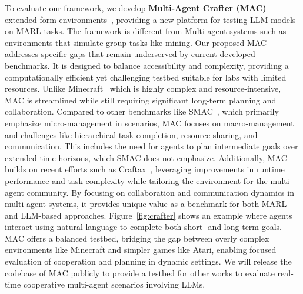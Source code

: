 

To evaluate our framework, we develop \textbf{Multi-Agent Crafter (MAC)} extended form environments~\cite{hafner2021benchmarking}, providing a new platform for testing LLM models on MARL tasks. 
The framework is different from Multi-agent systems such as environments that simulate group tasks like mining. Our proposed MAC addresses specific gaps that remain underserved by current developed benchmarks. It is designed to balance accessibility and complexity, providing a computationally efficient yet challenging testbed suitable for labs with limited resources. Unlike Minecraft~\cite{fan2022minedojo} which is highly complex and resource-intensive, MAC is streamlined while still requiring significant long-term planning and collaboration.
Compared to other benchmarks like SMAC~\cite{samvelyan2019starcraftmultiagentchallenge}, which primarily emphasize micro-management in scenarios, MAC focuses on macro-management and challenges like hierarchical task completion, resource sharing, and communication. This includes the need for agents to plan intermediate goals over extended time horizons, which SMAC does not emphasize.
Additionally, MAC builds on recent efforts such as Craftax~\cite{matthews2024craftaxlightningfastbenchmarkopenended}, leveraging improvements in runtime performance and task complexity while tailoring the environment for the multi-agent community. By focusing on collaboration and communication dynamics in multi-agent systems, it provides unique value as a benchmark for both MARL and LLM-based approaches. 
Figure~\ref{fig:crafter} shows an example where agents interact using natural language to complete both short- and long-term goals. MAC offers a balanced testbed, bridging the gap between overly complex environments like Minecraft and simpler games like Atari, enabling focused evaluation of cooperation and planning in dynamic settings. We will release the codebase of MAC publicly to provide a testbed for other works to evaluate real-time cooperative multi-agent scenarios involving LLMs.
